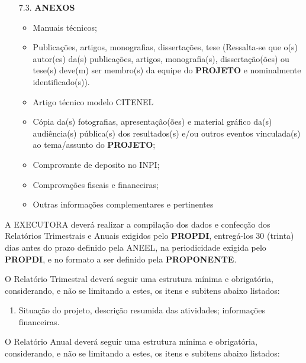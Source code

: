 {\begin{lmarginbox}
\begin{enumerate}[leftmargin=1cm, font=\bfseries]
        \item[7.3.] \textbf{ANEXOS}
            \begin{itemize}
                \item Manuais técnicos;
                \item Publicações, artigos, monografias, dissertações, tese (Ressalta-se que o(s) autor(es) da(s) publicações, artigos, monografia(s), dissertação(ões) ou tese(s) deve(m) ser membro(s) da equipe do \textbf{PROJETO} e nominalmente identificado(s)).
                \item Artigo técnico modelo CITENEL
                \item Cópia da(s) fotografias, apresentação(ões) e material gráfico da(s) audiência(s) pública(s) dos resultados(s) e/ou outros eventos vinculada(s) ao tema/assunto do \textbf{PROJETO};
                \item Comprovante de deposito no INPI;
                \item Comprovações fiscais e financeiras;
                \item Outras informações complementares e pertinentes

            \end{itemize}
    \end{enumerate}
\end{lmarginbox}
}




\xx A EXECUTORA deverá realizar a compilação dos dados e confecção dos Relatórios Trimestrais e Anuais exigidos pelo \textbf{PROPDI}, entregá-los 30 (trinta) dias antes do prazo definido pela ANEEL, na periodicidade exigida pelo \textbf{PROPDI}, e no formato a ser definido pela \textbf{PROPONENTE}.

\xxx  O Relatório Trimestral deverá seguir uma estrutura mínima e obrigatória, considerando, e não se limitando a estes, os itens e subitens abaixo listados:

\begin{enumerate}[label=\alph*), leftmargin=3cm]
    \item Situação do projeto, descrição resumida das atividades; informações financeiras.
\end{enumerate}


\xxx  O Relatório Anual deverá seguir uma estrutura mínima e obrigatória, considerando, e não se limitando a estes, os itens e subitens abaixo listados:

